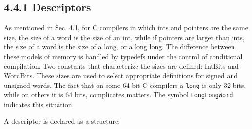 \subsection[4.4.1 Descriptors]{4.4.1 Descriptors}

As mentioned in Sec. 4.1, for C compilers in which ints and pointers
are the same size, the size of a word is the size of an int, while if
pointers are larger than ints, the size of a word is the size of a
long, or a long long. The difference between these models of memory is
handled by typedefs under the control of conditional compilation. Two
constants that characterize the sizes are defined: IntBits and
WordBits. These sizes are used to select appropriate definitions for
signed and unsigned words. The fact that on some 64-bit C compilers a
\texttt{long} is only 32 bits, while on others it is 64 bits,
complicates matters. The symbol \texttt{LongLongWord} indicates this
situation.

\bigskip


A descriptor is declared as a structure:


